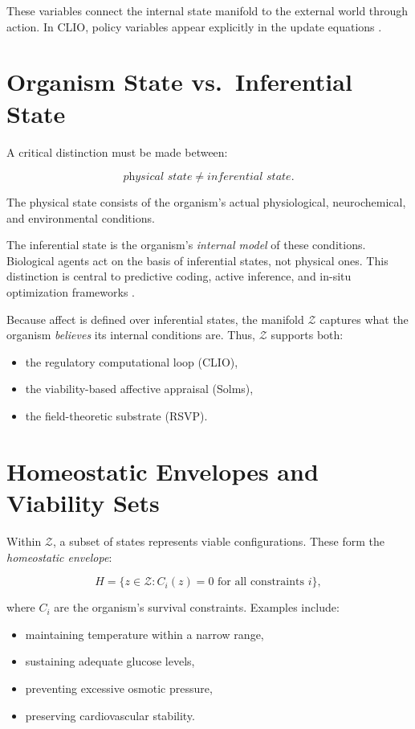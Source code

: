 \documentclass[12pt,oneside]{book}
\theoremstyle{plain}
\theoremstyle{definition}
\let\citep\parencite
\begin{document}
These variables connect the internal state manifold to the external world
through action.
In CLIO, policy variables appear explicitly in the update equations
\citep{cheng2025cognitive}.

\section{Organism State vs.\ Inferential State}

A critical distinction must be made between:

\[
\textit{physical state} \neq \textit{inferential state}.
\]

The physical state consists of the organism’s actual physiological,
neurochemical, and environmental conditions.

The inferential state is the organism’s \emph{internal model} of these
conditions.
Biological agents act on the basis of inferential states, not physical ones.
This distinction is central to predictive coding, active inference, and
in-situ optimization frameworks
\citep{friston2010free,cheng2025cognitive}.

Because affect is defined over inferential states, the manifold $\mathcal{Z}$
captures what the organism \emph{believes} its internal conditions are.
Thus, $\mathcal{Z}$ supports both:
\begin{itemize}
    \item the regulatory computational loop (CLIO),
    \item the viability-based affective appraisal (Solms),
    \item the field-theoretic substrate (RSVP).
\end{itemize}

\section{Homeostatic Envelopes and Viability Sets}

Within $\mathcal{Z}$, a subset of states represents viable configurations.
These form the \emph{homeostatic envelope}:

\[
H = \{z \in \mathcal{Z} : C_i(z) = 0 \text{ for all constraints } i\},
\]

where $C_i$ are the organism’s survival constraints.
Examples include:
\begin{itemize}
    \item maintaining temperature within a narrow range,
    \item sustaining adequate glucose levels,
    \item preventing excessive osmotic pressure,
    \item preserving cardiovascular stability.
\end{itemize}
\end{document}

